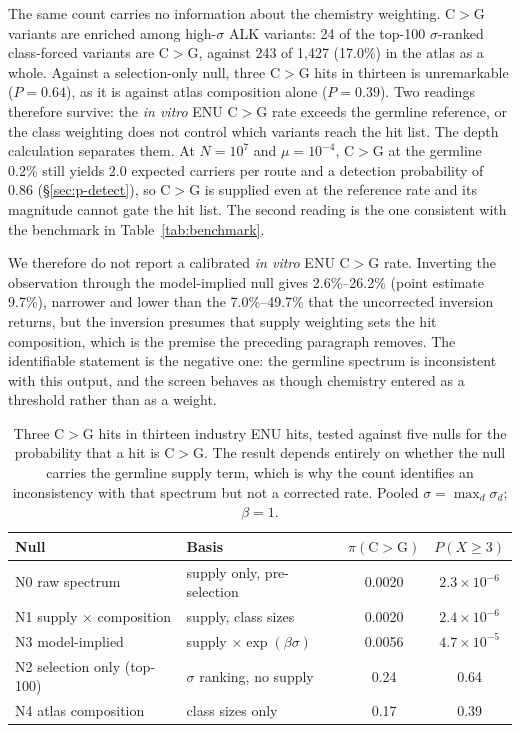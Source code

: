 \documentclass[11pt,a4paper]{article}
\begin{document}
The same count carries no information about the chemistry weighting.
C$>$G variants are enriched among high-$\sigma$ ALK variants: 24 of the
top-100 $\sigma$-ranked class-forced variants are C$>$G, against 243 of
1,427 (17.0\%) in the atlas as a whole. Against a selection-only null,
three C$>$G hits in thirteen is unremarkable ($P = 0.64$), as it is
against atlas composition alone ($P = 0.39$). Two readings therefore
survive: the \emph{in vitro} ENU C$>$G rate exceeds the germline
reference, or the class weighting does not control which variants reach
the hit list. The depth calculation separates them. At $N = 10^7$ and
$\mu = 10^{-4}$, C$>$G at the germline 0.2\% still yields 2.0 expected
carriers per route and a detection probability of 0.86
(\S\ref{sec:p-detect}), so C$>$G is supplied even at the reference rate
and its magnitude cannot gate the hit list. The second reading is the
one consistent with the benchmark in Table~\ref{tab:benchmark}.

We therefore do not report a calibrated \emph{in vitro} ENU C$>$G rate.
Inverting the observation through the model-implied null gives
2.6\%--26.2\% (point estimate 9.7\%), narrower and lower than the
7.0\%--49.7\% that the uncorrected inversion returns, but the inversion
presumes that supply weighting sets the hit composition, which is the
premise the preceding paragraph removes. The identifiable statement is
the negative one: the germline spectrum is inconsistent with this
output, and the screen behaves as though chemistry entered as a
threshold rather than as a weight.

\begin{table}[htbp]
\centering
\small
\caption{Three C$>$G hits in thirteen industry ENU hits, tested against
five nulls for the probability that a hit is C$>$G. The result depends
entirely on whether the null carries the germline supply term, which is
why the count identifies an inconsistency with that spectrum but not a
corrected rate. Pooled $\sigma = \max_d \sigma_d$; $\beta = 1$.}
\label{tab:enu-null}
\begin{tabular}{llcc}
\toprule
\textbf{Null} & \textbf{Basis} & $\pi(\mathrm{C}{>}\mathrm{G})$ & $P(X \geq 3)$ \\
\midrule
N0 raw spectrum          & supply only, pre-selection   & 0.0020 & $2.3\times 10^{-6}$ \\
N1 supply $\times$ composition & supply, class sizes    & 0.0020 & $2.4\times 10^{-6}$ \\
N3 model-implied         & supply $\times \exp(\beta\sigma)$ & 0.0056 & $4.7\times 10^{-5}$ \\
\midrule
N2 selection only (top-100) & $\sigma$ ranking, no supply & 0.24 & 0.64 \\
N4 atlas composition     & class sizes only             & 0.17 & 0.39 \\
\bottomrule
\end{tabular}
\end{table}
\end{document}
